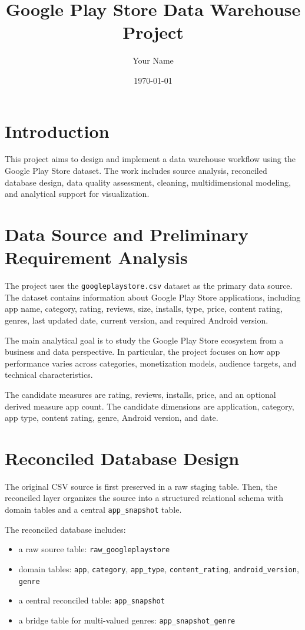\documentclass[11pt,a4paper]{article}
\title{Google Play Store Data Warehouse Project}
\author{Your Name}
\date{\today}
\begin{document}
\maketitle

\tableofcontents
\newpage

\section{Introduction}
This project aims to design and implement a data warehouse workflow using the Google Play Store dataset. The work includes source analysis, reconciled database design, data quality assessment, cleaning, multidimensional modeling, and analytical support for visualization.

\section{Data Source and Preliminary Requirement Analysis}
The project uses the \texttt{googleplaystore.csv} dataset as the primary data source. The dataset contains information about Google Play Store applications, including app name, category, rating, reviews, size, installs, type, price, content rating, genres, last updated date, current version, and required Android version.

The main analytical goal is to study the Google Play Store ecosystem from a business and data perspective. In particular, the project focuses on how app performance varies across categories, monetization models, audience targets, and technical characteristics.

The candidate measures are rating, reviews, installs, price, and an optional derived measure app count. The candidate dimensions are application, category, app type, content rating, genre, Android version, and date.

\section{Reconciled Database Design}
The original CSV source is first preserved in a raw staging table. Then, the reconciled layer organizes the source into a structured relational schema with domain tables and a central \texttt{app\_snapshot} table.

The reconciled database includes:
\begin{itemize}
    \item a raw source table: \texttt{raw\_googleplaystore}
    \item domain tables: \texttt{app}, \texttt{category}, \texttt{app\_type}, \texttt{content\_rating}, \texttt{android\_version}, \texttt{genre}
    \item a central reconciled table: \texttt{app\_snapshot}
    \item a bridge table for multi-valued genres: \texttt{app\_snapshot\_genre}
\end{itemize}
\end{document}

